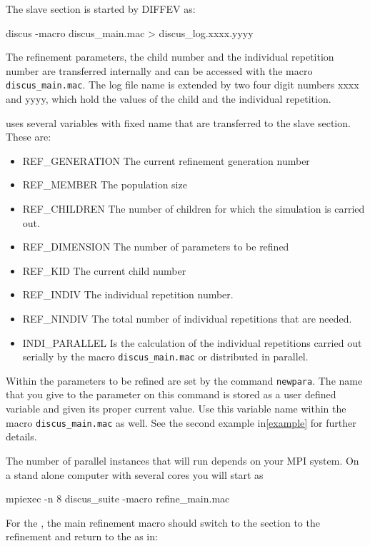 The slave section is started by DIFFEV as:
\begin{MacVerbatim}
discus -macro discus_main.mac > discus_log.xxxx.yyyy
\end{MacVerbatim}

The refinement parameters, the child number and the individual repetition
number are transferred internally and can be accessed with the macro
{\tt discus\_main.mac}. 
The log file
name is extended by two four digit numbers xxxx and yyyy, which hold the 
values of the child and the individual repetition.

\Diffev uses several variables with fixed name that are transferred to the 
slave section. These are:
\begin{itemize}
  \item REF\_GENERATION  The current refinement generation number
  \item REF\_MEMBER  The population size
  \item REF\_CHILDREN The number of children for which the simulation is carried out.
  \item REF\_DIMENSION The number of parameters to be refined
  \item REF\_KID The current child number
  \item REF\_INDIV The individual repetition number.
  \item REF\_NINDIV The total number of individual repetitions that are needed.
  \item INDI\_PARALLEL Is the calculation of the individual repetitions carried out
              serially by the macro {\tt discus\_main.mac} or distributed in parallel.
\end{itemize}

Within \Diffev the parameters to be refined are set by the command {\tt newpara}.
The name that you give to the parameter on this command is stored as a user 
defined variable and given its proper current value. Use this variable name within
the macro {\tt discus\_main.mac} as well. See the second example in\ref{example}
for further details.

The number of parallel instances that will run depends on your MPI system. 
On a stand alone computer with several cores you will start \Diffev as 

\begin{MacVerbatim}
   mpiexec -n 8 discus_suite -macro refine_main.mac
\end{MacVerbatim}

For the \Suite, the main refinement macro should switch to the \Diffev
section to the refinement and return to the \Suite as in: 

